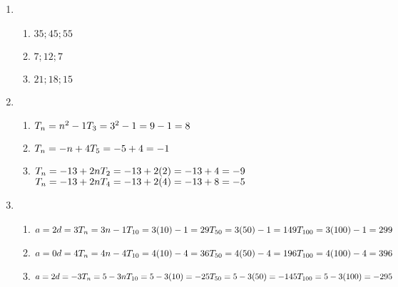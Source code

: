  \begin{solutions}{}{
\begin{enumerate}[noitemsep, label=\textbf{\arabic*}. ] 
\item 
  \begin{enumerate} [noitemsep, label=\textbf{(\alph*)} ]
  \item $35;45;55$
  \item $7;12;7$
  \item $21;18;15$
  \end{enumerate}
 \item 
  \begin{enumerate} [noitemsep, label=\textbf{(\alph*)} ]
  \item $T_n = n^{2}-1\\
T_3 = 3^2 - 1\\
= 9 -1\\
= 8$
  \item $T_n = -n + 4\\
T_5 = -5 + 4\\
= -1$
  \item $T_n = -13 + 2n\\
T_2 = -13 + 2(2)\\
= -13 + 4\\
= -9$ \\
$T_n = -13 + 2n\\
T_4 = -13 + 2(4)\\
= -13 + 8\\
= -5$
  \end{enumerate}
\item 
  \begin{enumerate}[noitemsep, label=\textbf{(\alph*)} ]
  \item $a = 2\\
d = 3\\
T_n = 3n - 1\\
T_{10} = 3(10) - 1 = 29\\
T_{50} = 3(50) - 1 = 149\\
T_{100} = 3(100) - 1 = 299$ 
  \item $a = 0\\
d = 4\\
T_n = 4n - 4\\
T_{10} = 4(10) - 4 = 36\\
T_{50} = 4(50) - 4 = 196\\
T_{100} = 4(100) - 4 = 396$ 
  \item $a = 2\\
d = -3\\
T_n = 5 - 3n\\
T_{10} = 5 - 3(10) = -25\\
T_{50} = 5 - 3(50) = -145\\
T_{100} = 5 - 3(100) = -295$ 
  \end{enumerate}
\end{enumerate}}
\end{solutions}



